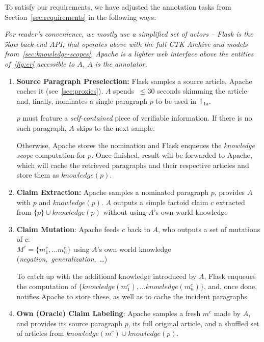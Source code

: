 To satisfy our requirements, we have adjusted the annotation tasks from Section~\ref{sec:requirements} in the following ways: 

\textit{For reader's convenience, we mostly use a simplified set of actors -- \textsf{Flask} is the \"{slow} back-end \textsf{API}, that operates above with the full \textsf{ČTK Archive} and models from~\ref{sec:knowledge-scopes}, \textsf{Apache} is a lighter web interface above the entities of~\ref{fig:er} accessible to $A$, $A$ is the annotator.}
\begin{enumerate}
        \item[\itembox{$\textsf{T}_{\textsf{0~}}$}] \textbf{Source Paragraph Preselection:} \textsf{Flask} samples a source article, \textsf{Apache} caches it (see~\ref{sec:proxies}). $A$ spends $~\leq 30$ seconds skimming the article and, finally, nominates a single paragraph $p$ to be used in $\textsf{T}_{\textsf{1a}}$. 
        
        $p$ must feature a \textit{self-contained} piece of verifiable information. If there is no such paragraph, $A$ skips to the next sample. 
        
        Otherwise, \textsf{Apache} stores the nomination and \textsf{Flask} enqueues the \textit{knowledge scope} computation for $p$. Once finished, result will be forwarded to \textsf{Apache}, which will cache the retrieved paragraphs and their respective articles and store them as $knowledge(p)$.
        
        
        \label{t0}
        \item[\itembox{$\textsf{T}_{\textsf{1a}}$}] \textbf{Claim Extraction:} \textsf{Apache} samples a nominated paragraph $p$, provides $A$ with $p$ and $knowledge(p)$. $A$ outputs a simple factoid claim $c$ extracted from $\{p\}\cup knowledge(p)$ without using $A$'s own world knowledge
        \label{t1a}
        \item [\itembox{$\textsf{T}_{\textsf{1b}}$}]\textbf{Claim Mutation}: \textsf{Apache} feeds $c$ back to $A$, who outputs a set of mutations of $c$: \\
        $M^c=\{m^c_1,\dots m^c_n\}$ using $A$'s own world knowledge (\textit{negation},~\textit{generalization},~\dots)\label{t1b}
        
        To catch up with the additional knowledge introduced by $A$, \textsf{Flask} enqueues the computation of $\{knowledge(m^c_1),\dots knowledge(m^c_n)\}$, and, once done, notifies \textsf{Apache} to store these, as well as to cache the incident paragraphs.
        \item[\itembox{$\textsf{T}_{\textsf{2a}}$}] \textbf{Own (Oracle) Claim Labeling}: \textsf{Apache} samples a fresh $m^c$ made by $A$, and provides its source paragraph $p$, its full original article, and a shuffled set of articles from $knowledge(m^c)\cup knowledge(p)$.
        

\end{enumerate}
